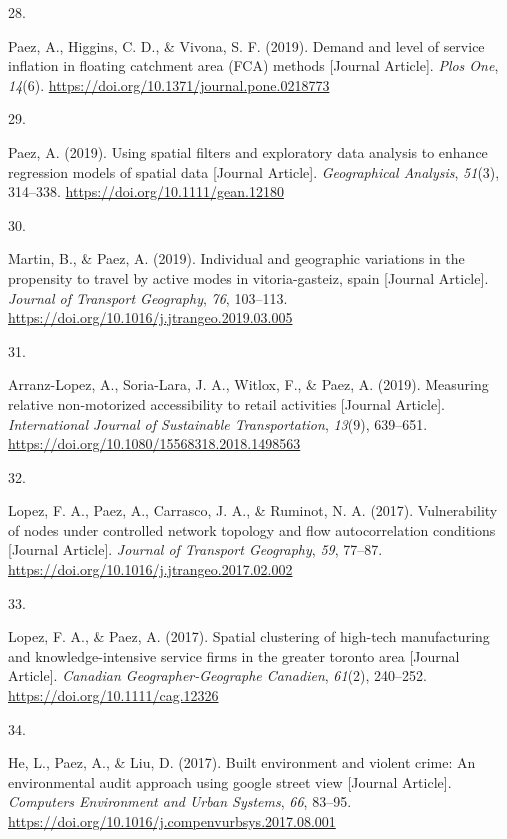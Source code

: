 \documentclass[11pt,a4paper,]{awesome-cv}
\newlength{\csllabelwidth}
\newcommand{\CSLLeftMargin}[1]{\parbox[t]{\csllabelwidth}{#1}}
\newcommand{\CSLRightInline}[1]{\parbox[t]{\linewidth - \csllabelwidth}{#1}}
\begin{document}
\leavevmode{}%
\CSLLeftMargin{28. }
\CSLRightInline{Paez, A., Higgins, C. D., \& Vivona, S. F. (2019).
Demand and level of service inflation in floating catchment area (FCA)
methods {[}Journal Article{]}. \emph{Plos One}, \emph{14}(6).
\url{https://doi.org/10.1371/journal.pone.0218773}}

\leavevmode{}%
\CSLLeftMargin{29. }
\CSLRightInline{Paez, A. (2019). Using spatial filters and exploratory
data analysis to enhance regression models of spatial data {[}Journal
Article{]}. \emph{Geographical Analysis}, \emph{51}(3), 314--338.
\url{https://doi.org/10.1111/gean.12180}}

\leavevmode{}%
\CSLLeftMargin{30. }
\CSLRightInline{Martin, B., \& Paez, A. (2019). Individual and
geographic variations in the propensity to travel by active modes in
vitoria-gasteiz, spain {[}Journal Article{]}. \emph{Journal of Transport
Geography}, \emph{76}, 103--113.
\url{https://doi.org/10.1016/j.jtrangeo.2019.03.005}}

\leavevmode{}%
\CSLLeftMargin{31. }
\CSLRightInline{Arranz-Lopez, A., Soria-Lara, J. A., Witlox, F., \&
Paez, A. (2019). Measuring relative non-motorized accessibility to
retail activities {[}Journal Article{]}. \emph{International Journal of
Sustainable Transportation}, \emph{13}(9), 639--651.
\url{https://doi.org/10.1080/15568318.2018.1498563}}

\leavevmode{}%
\CSLLeftMargin{32. }
\CSLRightInline{Lopez, F. A., Paez, A., Carrasco, J. A., \& Ruminot, N.
A. (2017). Vulnerability of nodes under controlled network topology and
flow autocorrelation conditions {[}Journal Article{]}. \emph{Journal of
Transport Geography}, \emph{59}, 77--87.
\url{https://doi.org/10.1016/j.jtrangeo.2017.02.002}}

\leavevmode{}%
\CSLLeftMargin{33. }
\CSLRightInline{Lopez, F. A., \& Paez, A. (2017). Spatial clustering of
high-tech manufacturing and knowledge-intensive service firms in the
greater toronto area {[}Journal Article{]}. \emph{Canadian
Geographer-Geographe Canadien}, \emph{61}(2), 240--252.
\url{https://doi.org/10.1111/cag.12326}}

\leavevmode{}%
\CSLLeftMargin{34. }
\CSLRightInline{He, L., Paez, A., \& Liu, D. (2017). Built environment
and violent crime: An environmental audit approach using google street
view {[}Journal Article{]}. \emph{Computers Environment and Urban
Systems}, \emph{66}, 83--95.
\url{https://doi.org/10.1016/j.compenvurbsys.2017.08.001}}
\end{document}
